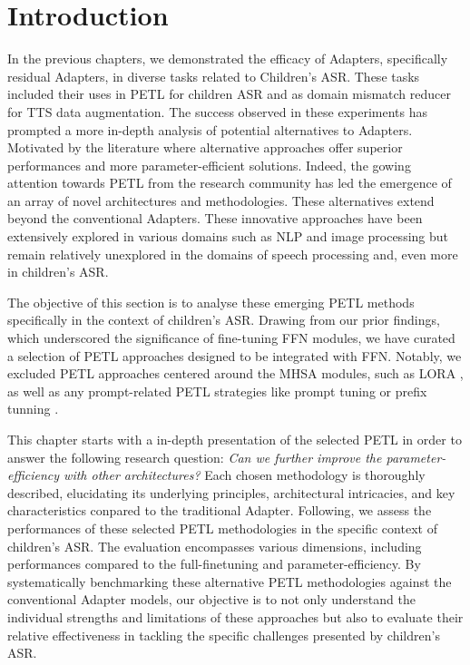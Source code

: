 \label{chap:7}
\cleardoublepage
\section{Introduction}
In the previous chapters, we demonstrated the efficacy of Adapters, specifically residual Adapters, in diverse tasks related to Children's \ac{ASR}. These tasks included their uses in \ac{PETL} for children \ac{ASR} and as domain mismatch reducer for \ac{TTS} data augmentation. The success observed in these experiments has prompted a more in-depth analysis of potential alternatives to Adapters. Motivated by the literature where alternative approaches offer superior performances and more parameter-efficient solutions.
Indeed, the gowing attention towards \ac{PETL} from the research community has led the emergence of an array of novel architectures and methodologies. These alternatives extend beyond the conventional Adapters. These innovative approaches have been extensively explored in various domains such as \ac{NLP} and image processing but remain relatively unexplored in the domains of speech processing and, even more in children's \ac{ASR}.

The objective of this section is to analyse these emerging \ac{PETL} methods specifically in the context of children's \ac{ASR}. Drawing from our prior findings, which underscored the significance of fine-tuning \ac{FFN} modules, we have curated a selection of \ac{PETL} approaches designed to be integrated with \ac{FFN}. Notably, we excluded \ac{PETL} approaches centered around the \ac{MHSA} modules, such as LORA \cite{hu2022lora}, as well as any prompt-related \ac{PETL} strategies like prompt tuning \cite{lester-etal-2021-power} or prefix tunning \cite{li-liang-2021-prefix}.

This chapter starts with a in-depth presentation of the selected \ac{PETL} in order to answer the following research question: \textit{Can we further improve the parameter-efficiency with other architectures? } Each chosen methodology is thoroughly described, elucidating its underlying principles, architectural intricacies, and key characteristics conpared to the traditional Adapter. 
Following, we assess the performances of these selected \ac{PETL} methodologies  in the specific context of children's \ac{ASR}. The evaluation encompasses various dimensions, including performances compared to the full-finetuning and parameter-efficiency. By systematically benchmarking these alternative \ac{PETL} methodologies against the conventional Adapter models, our objective is to not only understand the individual strengths and limitations of these approaches but also to evaluate their relative effectiveness in tackling the specific challenges presented by children's \ac{ASR}.

